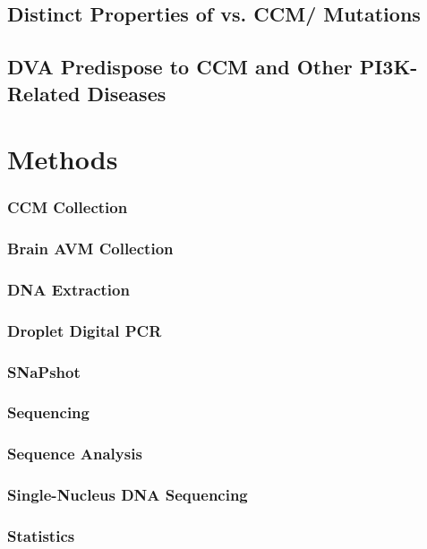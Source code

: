 \subsection{Distinct Properties of  vs. CCM/ Mutations}
\subsection{DVA Predispose to CCM and Other PI3K-Related Diseases}

\section{Methods}
\subsubsection{CCM Collection}
\subsubsection{Brain AVM Collection}
\subsubsection{DNA Extraction}
\subsubsection{Droplet Digital PCR}
\subsubsection{SNaPshot}
\subsubsection{Sequencing}
\subsubsection{Sequence Analysis}
\subsubsection{Single-Nucleus DNA Sequencing}
\subsubsection{Statistics}